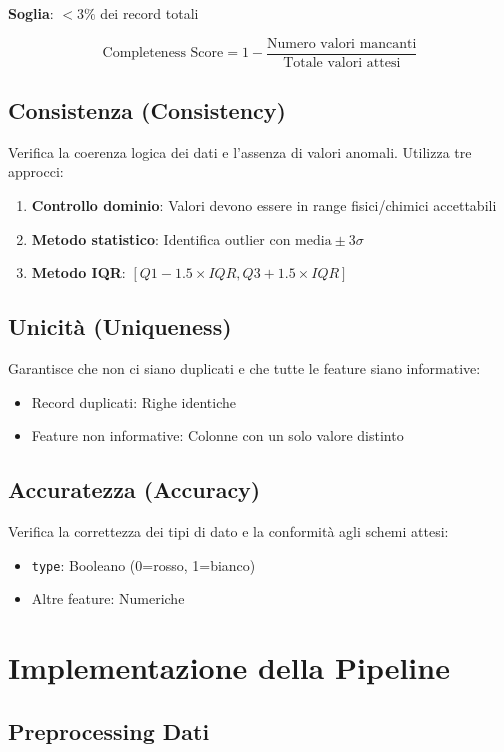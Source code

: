 \documentclass[a4paper, 12pt]{article}
\begin{document}
\textbf{Soglia}: \(<3\%\) dei record totali

\[
\text{Completeness Score} = 1 - \frac{\text{Numero valori mancanti}}{\text{Totale valori attesi}}
\]

\subsection{Consistenza (Consistency)}
Verifica la coerenza logica dei dati e l'assenza di valori anomali. Utilizza tre approcci:
\begin{enumerate}
    \item \textbf{Controllo dominio}: Valori devono essere in range fisici/chimici accettabili
    \item \textbf{Metodo statistico}: Identifica outlier con \( \text{media} \pm 3\sigma \)
    \item \textbf{Metodo IQR}: \( [Q1 - 1.5 \times IQR, Q3 + 1.5 \times IQR] \)
\end{enumerate}

\subsection{Unicità (Uniqueness)}
Garantisce che non ci siano duplicati e che tutte le feature siano informative:
\begin{itemize}
    \item Record duplicati: Righe identiche
    \item Feature non informative: Colonne con un solo valore distinto
\end{itemize}

\subsection{Accuratezza (Accuracy)}
Verifica la correttezza dei tipi di dato e la conformità agli schemi attesi:
\begin{itemize}
    \item \texttt{type}: Booleano (0=rosso, 1=bianco)
    \item Altre feature: Numeriche
\end{itemize}

\section{Implementazione della Pipeline}

\subsection{Preprocessing Dati}
\end{document}
